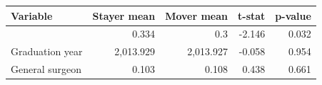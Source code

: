 \begin{table}[t]
\fontsize{12.0pt}{14.0pt}\selectfont
\begin{tabular*}{\linewidth}{@{\extracolsep{\fill}}l|rrrr}
\toprule
Variable & Stayer mean & Mover mean & t-stat & p-value \\ 
\midrule\addlinespace[2.5pt]
{\hspace{15pt}Female} & 0.334 & 0.3 & -2.146 & 0.032 \\ 
{\hspace{15pt}Graduation year} & 2,013.929 & 2,013.927 & -0.058 & 0.954 \\ 
{\hspace{15pt}General surgeon} & 0.103 & 0.108 & 0.438 & 0.661 \\ 
\bottomrule
\end{tabular*}
\end{table}

